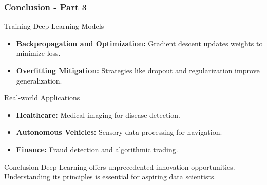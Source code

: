 \documentclass[aspectratio=169]{beamer}
\begin{document}
\begin{frame}[fragile]
    \frametitle{Conclusion - Part 3}
    \begin{block}{Training Deep Learning Models}
        \begin{itemize}
            \item \textbf{Backpropagation and Optimization:} Gradient descent updates weights to minimize loss.
            \item \textbf{Overfitting Mitigation:} Strategies like dropout and regularization improve generalization.
        \end{itemize}
    \end{block}

    \begin{block}{Real-world Applications}
        \begin{itemize}
            \item \textbf{Healthcare:} Medical imaging for disease detection.
            \item \textbf{Autonomous Vehicles:} Sensory data processing for navigation.
            \item \textbf{Finance:} Fraud detection and algorithmic trading.
        \end{itemize}
    \end{block}
    
    \begin{block}{Conclusion}
        Deep Learning offers unprecedented innovation opportunities. Understanding its principles is essential for aspiring data scientists.
    \end{block}
\end{frame}
\end{document}
